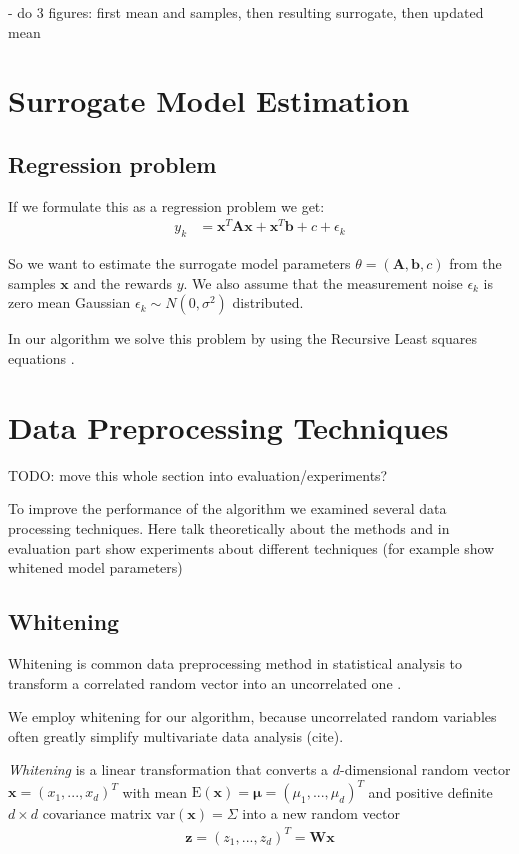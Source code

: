 - do 3 figures: first mean and samples, then resulting surrogate, then updated mean

\section{Surrogate Model Estimation}

\subsection{Regression problem}

If we formulate this as a regression problem we get:
\begin{align*}
  y_k &=  \mathbf{x}^T \mathbf{A} \mathbf{x} + \mathbf{x}^T \mathbf{b} + c + \epsilon_k
\end{align*}

So we want to estimate the surrogate model parameters $\theta = (\mathbf{A}, \mathbf{b}, c)$ from the samples $\mathbf{x}$
and the rewards $y$. We also assume that
the measurement noise $\epsilon_k$ is zero mean Gaussian $\epsilon_k \sim N(0, \sigma^2)$ distributed.

In our algorithm we solve this problem by using the Recursive Least squares equations .

\section{Data Preprocessing Techniques}
TODO: move this whole section into evaluation/experiments?

To improve the performance of the algorithm we examined several data processing techniques.
Here talk theoretically about the methods and in evaluation part
show experiments about different techniques (for example show whitened model
parameters)

\subsection{Whitening}
Whitening is common data preprocessing method in statistical analysis
to transform a correlated random vector into an uncorrelated one
\citet{kessy2018optimal}.

We employ whitening for our algorithm, because uncorrelated
random variables often greatly simplify  multivariate data analysis (cite).

\textit{Whitening} is a linear transformation that converts a $d$-dimensional
random vector $\mathbf{x} = (x_1,...,x_d)^T$ with mean
$\text{E}(\mathbf{x}) = \mathbf{\mu} = (\mu_1,...,\mu_d)^T$ and
positive definite $d \times d$ covariance matrix
var$(\mathbf{x}) = \Sigma$ into a new random vector
\begin{align}
  \label{whitening}
 \mathbf{z} = (z_1,...,z_d)^T = \mathbf{W}\mathbf{x}
\end{align}

